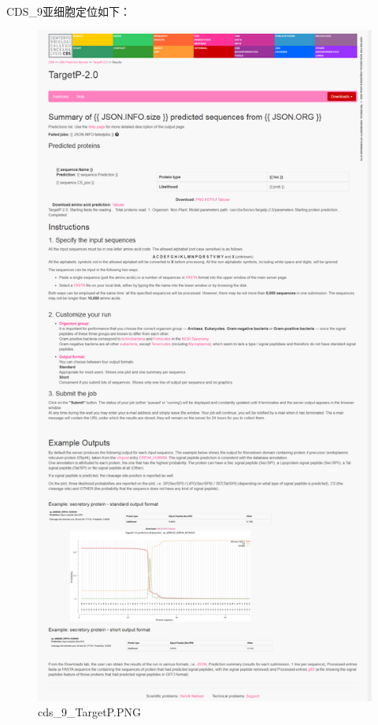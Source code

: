 \documentclass[supercite]{HustGraduPaper}
\begin{document}
	\paragraph{}\label{subpara:subpara}CDS\_9亚细胞定位如下：
	\begin{figure}[H]
		\centering
		\includegraphics[width=1\textwidth]{./material/practice2/cds_9/TargetP.png}
		\caption{cds\_9\_TargetP.PNG}
	\end{figure}
\end{document}
